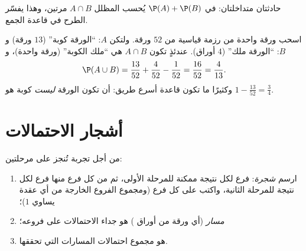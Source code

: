 \begin{omfigure}

{\small حادثتان متداخلتان: في $\P(A) + \P(B)$ يُحسب 
المظلل $A \cap B$ مرتين، وهذا يفسّر الطرح
في قاعدة الجمع.}
\end{omfigure}

\begin{example}\label{ex:g10:proba:cards}
اسحب ورقة واحدة من رزمة قياسية من $52$ ورقة. ولتكن $A$: ``الورقة
كوبة'' ($13$ ورقة) و $B$: ``الورقة ملك'' ($4$ أوراق). عندئذٍ
تكون $A \cap B$ هي ``ملك الكوبة'' (ورقة واحدة)، و
\[
\P(A \cup B) = \frac{13}{52} + \frac{4}{52} - \frac{1}{52} = \frac{16}{52}
= \frac{4}{13}.
\]
وكثيرًا ما تكون قاعدة  أسرع طريق:  أن تكون الورقة
\emph{ليست} كوبة هو $1 - \frac{13}{52} = \frac34$.
\end{example}

\section{أشجار الاحتمالات}

\begin{method}\label{met:g10:proba:tree}
من أجل تجربة تُنجز على مرحلتين:
\begin{enumerate}
  \item ارسم \emph{شجرة}: فرع لكل نتيجة ممكنة
        للمرحلة الأولى، ثم من كل فرع منها فرع لكل
        نتيجة للمرحلة الثانية، واكتب  على كل فرع
        (ومجموع الفروع الخارجة من أي عقدة يساوي $1$)؛
  \item {} \emph{مسار} (أي ورقة من أوراق ) هو
        جداء الاحتمالات على فروعه؛
  \item {}  هو مجموع احتمالات
        المسارات التي تحققها.
\end{enumerate}
\end{method}

